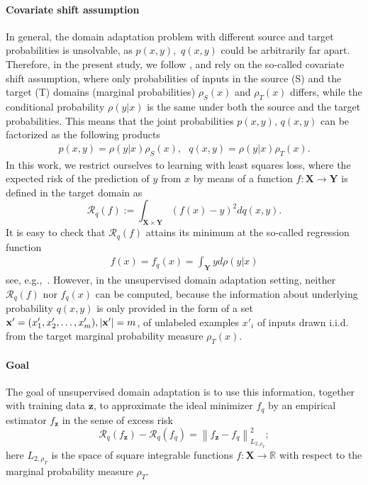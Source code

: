 \documentclass[USenglish]{article}
\newcommand{\norm}[1]{\left\lVert#1\right\rVert}
\newcommand{\bz}{\mathbf{z}}
\newcommand{\x}{{\bf x}}
\begin{document}
\paragraph*{Covariate shift assumption}
In general, the domain adaptation problem with different source and target probabilities is unsolvable, as $p(x,y),$ $q(x,y)$ could be arbitrarily far apart. Therefore, in the present study, we follow \cite{shimodaira2000}, \cite{huang2006} and rely on the so-called covariate shift assumption, where only probabilities of inputs in the source (S) and the target (T) domains (marginal probabilities) $\rho_S (x)$ and $\rho_T (x)$ differs, while the conditional probability $\rho (y|x)$ is the same under both the source and the target probabilities. This means that the joint probabilities $p(x,y)$, $q(x,y)$ can be factorized as the following products
	\begin{align}\label{covar_shift_assump}
	p(x,y) = \rho(y|x)\rho_S (x),\text{       } q(x,y) = \rho(y|x)\rho_T (x).
	\end{align}
In this work, we restrict ourselves to learning with least squares loss, where the expected risk of the prediction of $y$ from $x$ by means of a function $f: \mathbf{X} \rightarrow \mathbf{Y}$ is defined in the target domain as 
	$$\mathcal{R}_q (f) := \int_{\mathbf{X} \times \mathbf{Y}} (f(x) - y)^2 d q(x,y).$$ 
It is easy to check that $\mathcal{R}_q (f)$ attains its minimum at the so-called regression function
	\begin{align}\label{regress_func}
	f(x) = f_{q} (x) = \int_{\mathbf{Y}} y d \rho(y|x )
	\end{align}
see, e.g.,~\cite[Proposition~1]{Cucker2001OnTM}.
However, in the unsupervised domain adaptation setting, neither $\mathcal{R}_q (f)$ nor $f_{q} (x)$ can be computed, because the information about underlying probability $q(x,y)$ is only provided in the form of a set $\x' = (x'_1,x'_2,\ldots,x'_m), |\x'| = m$, of unlabeled examples $x'_i$ of inputs drawn i.i.d. from the target marginal probability measure $\rho_T (x)$.

\paragraph*{Goal}
The goal of unsupervised domain adaptation is to use this information, together with training data $\bz$, to approximate the ideal minimizer $f_q$ by an empirical estimator $f_\bz$ in the sense of excess risk
	$$\mathcal{R}_q (f_\bz) - \mathcal{R}_q (f_q) = \norm{f_\bz - f_q}^2_{L_{2,\rho_T}};$$
	here $L_{2,\rho_T}$ is the space of square integrable functions $f: \mathbf{X} \rightarrow \mathbb{R}$ with respect to the marginal probability measure $\rho_T$.
\end{document}
